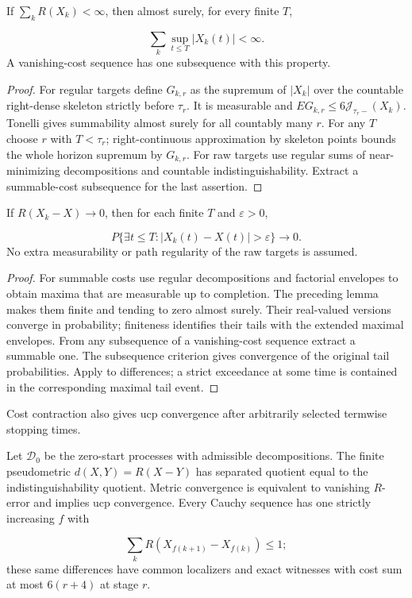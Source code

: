 \begin{lemma}
If $\sum_kR(X_k)<\infty$, then almost surely, for every finite $T$,

\[
 \sum_k\sup_{t\leq T}|X_k(t)|<\infty.
\]
A vanishing-cost sequence has one subsequence with this property.
\end{lemma}
\begin{proof}
For regular targets define $G_{k,r}$ as the supremum of $|X_k|$ over the
countable right-dense skeleton strictly before $\tau_r$.
It is measurable and $EG_{k,r}\leq6\mathcal J_{\tau_r-}(X_k)$.
Tonelli gives summability almost surely for all countably many $r$.
For any $T$ choose $r$ with $T<\tau_r$; right-continuous approximation by
skeleton points bounds the whole horizon supremum by $G_{k,r}$.
For raw targets use regular sums of near-minimizing decompositions and
countable indistinguishability. Extract a summable-cost subsequence for the
last assertion.
\end{proof}
\begin{lemma}
If $R(X_k-X)\to0$, then for each finite $T$ and $\varepsilon>0$,

\[
 P\{\exists t\leq T:|X_k(t)-X(t)|>\varepsilon\}\to0.
\]
No extra measurability or path regularity of the raw targets is assumed.
\end{lemma}
\begin{proof}
For summable costs use regular decompositions and factorial envelopes to
obtain maxima that are measurable up to completion. The preceding lemma makes
them finite and tending to zero almost surely. Their real-valued versions
converge in probability; finiteness identifies their tails with the extended
maximal envelopes. From any subsequence of a vanishing-cost sequence extract
a summable one. The subsequence criterion gives convergence of the original
tail probabilities. Apply to differences; a strict exceedance at some time
is contained in the corresponding maximal tail event.
\end{proof}
Cost contraction also gives ucp convergence after arbitrarily selected
termwise stopping times.
\begin{proposition}
Let $\mathcal D_0$ be the zero-start processes with admissible decompositions.
The finite pseudometric $d(X,Y)=R(X-Y)$ has separated quotient equal to the
indistinguishability quotient. Metric convergence is equivalent to vanishing
$R$-error and implies ucp convergence. Every Cauchy sequence has one strictly
increasing $f$ with

\[
 \sum_kR(X_{f(k+1)}-X_{f(k)})\leq1;
\] these same differences have common
localizers and exact witnesses with cost sum at most $6(r+4)$ at stage $r$.
\end{proposition}
